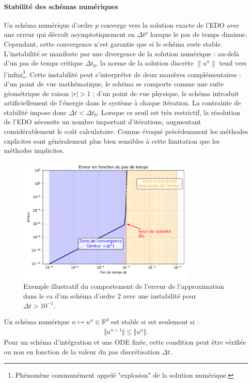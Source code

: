 \paragraph{Stabilité des schémas numériques}
Un schéma numérique d'ordre $p$ converge vers la solution exacte de l'EDO avec une erreur qui décroît asymptotiquement en $\Delta t^p$ lorsque le pas de temps diminue.
Cependant, cette convergence n'est garantie que si le schéma reste stable.
L'instabilité se manifeste par une divergence de la solution numérique : au-delà d'un pas de temps critique $\Delta t_0$, la norme de la solution discrète $\|u^n\|$ tend vers l'infini\footnote{Phénomène communément appelé "explosion" de la solution numérique.}.
Cette instabilité peut s'interpréter de deux manières complémentaires : d'un point de vue mathématique, le schéma se comporte comme une suite géométrique de raison $|r| > 1$ ; d'un point de vue physique, le schéma introduit artificiellement de l'énergie dans le système à chaque itération.
La contrainte de stabilité impose donc $\Delta t < \Delta t_0$. Lorsque ce seuil est très restrictif, la résolution de l'EDO nécessite un nombre important d'itérations, augmentant considérablement le coût calculatoire. 
Comme évoqué précédemment les méthodes explicites sont généralement plus bien sensibles à cette limitation que les méthodes implicites.
\begin{figure}[htbp]
    \centering
    \includegraphics[width=0.8\textwidth]{media/3_/2_/exemple_satabilite.pdf}
    \caption{Exemple illustratif du comportement de l'erreur de l'approximation dans le ca d'un schéma d'ordre 2 avec une instabilité pour $\Delta t > 10^{-1}$.}
    \label{fig:stabilite_schema}
\end{figure}
\begin{definition}
    Un schéma numérique $n \mapsto u^n \in \mathbb{R}^d$ est stable si est seulement si :
    \begin{align}
        \Vert u^{n+1} \Vert \leq \Vert u^n \Vert.
    \end{align}
    Pour un schéma d'intégration et une ODE fixée, cette condition peut être vérifiée ou non en fonction de la valeur 
    du pas discrétisation $\Delta t$.
\end{definition}
